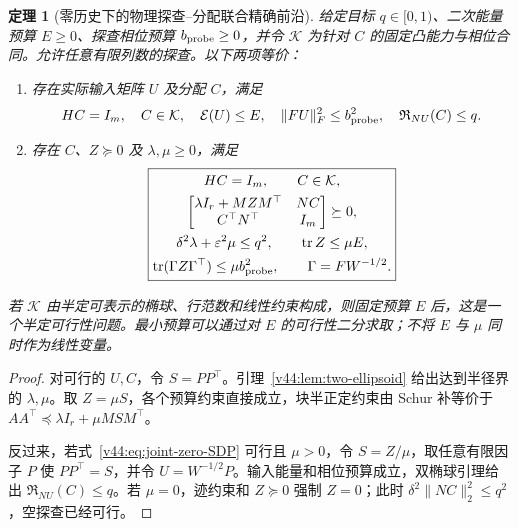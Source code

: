 \documentclass[11pt,a4paper]{article}
\numberwithin{equation}{section}
\newtheorem{theorem}{定理}[section]
\theoremstyle{definition}
\begin{document}
\begin{theorem}[零历史下的物理探查--分配联合精确前沿]
\label{v44:thm:joint-zero-SDP}
给定目标 $q\in[0,1)$、二次能量预算 $E\ge0$、探查相位预算 $b_{\rm probe}\ge0$，并令 $\mathcal K$ 为针对 $C$ 的固定凸能力与相位合同。允许任意有限列数的探查。以下两项等价：
\begin{enumerate}
 \item 存在实际输入矩阵 $U$ 及分配 $C$，满足
 \[
 HC=I_m,\quad C\in\mathcal K,\quad
 \mathcal E(U)\le E,\quad\|FU\|_F^2\le b_{\rm probe}^2,
 \quad\mathfrak R_{NU}(C)\le q.
 \]
 \item 存在 $C$、$Z\succeq0$ 及 $\lambda,\mu\ge0$，满足
 \begin{equation}
 \boxed{
 \begin{gathered}
 HC=I_m,\qquad C\in\mathcal K,\\
 \begin{bmatrix}
 \lambda I_r+MZM^\top&NC\\
 C^\top N^\top&I_m
 \end{bmatrix}\succeq0,\\
 \delta^2\lambda+\varepsilon^2\mu\le q^2,\qquad
 \operatorname{tr}Z\le\mu E,\\
 \operatorname{tr}(\Gamma Z\Gamma^\top)
       \le\mu b_{\rm probe}^2,
 \qquad\Gamma=FW^{-1/2}.
 \end{gathered}}
 \label{v44:eq:joint-zero-SDP}
 \end{equation}
\end{enumerate}
若 $\mathcal K$ 由半定可表示的椭球、行范数和线性约束构成，则固定预算 $E$ 后，这是一个半定可行性问题。最小预算可以通过对 $E$ 的可行性二分求取；不将 $E$ 与 $\mu$ 同时作为线性变量。
\end{theorem}

\begin{proof}
对可行的 $U,C$，令 $S=PP^\top$。引理~\ref{v44:lem:two-ellipsoid} 给出达到半径界的 $\lambda,\mu$。取 $Z=\mu S$，各个预算约束直接成立，块半正定约束由 Schur 补等价于
$AA^\top\preceq\lambda I_r+\mu MSM^\top$。

反过来，若式~\eqref{v44:eq:joint-zero-SDP} 可行且 $\mu>0$，令 $S=Z/\mu$，取任意有限因子 $P$ 使 $PP^\top=S$，并令 $U=W^{-1/2}P$。输入能量和相位预算成立，双椭球引理给出 $\mathfrak R_{NU}(C)\le q$。若 $\mu=0$，迹约束和 $Z\succeq0$ 强制 $Z=0$；此时 $\delta^2\|NC\|_2^2\le q^2$，空探查已经可行。
\end{proof}
\end{document}
